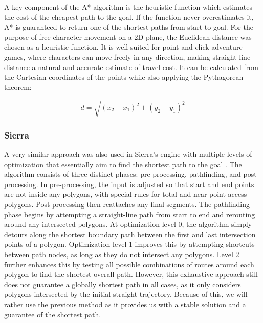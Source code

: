 A key component of the A* algorithm is the heuristic function which estimates the cost of the cheapest path to the goal. If the function never overestimates it, A* is guaranteed to return one of the shortest paths from start to goal. For the purpose of free character movement on a 2D plane, the Euclidean distance was chosen as a heuristic function. It is well suited for point-and-click adventure games, where characters can move freely in any direction, making straight-line distance a natural and accurate estimate of travel cost.  It can be calculated from the Cartesian coordinates of the points while also applying the Pythagorean theorem:

\[
d = \sqrt{(x_2 - x_1)^2 + (y_2 - y_1)^2}
\]

\subsubsection{Sierra}
A very similar approach was also used in Sierra's engine with multiple levels of optimization that essentially aim to find the shortest path to the goal \cite{ScummVM-patent}. The algorithm consists of three distinct phases: pre-processing, pathfinding, and post-processing. In pre-processing, the input is adjusted so that start and end points are not inside any polygons, with special rules for total and near-point access polygons. Post-processing then reattaches any final segments. The pathfinding phase begins by attempting a straight-line path from start to end and rerouting around any intersected polygons. At optimization level 0, the algorithm simply detours along the shortest boundary path between the first and last intersection points of a polygon. Optimization level 1 improves this by attempting shortcuts between path nodes, as long as they do not intersect any polygons. Level 2 further enhances this by testing all possible combinations of routes around each polygon to find the shortest overall path. However, this exhaustive approach still does not guarantee a globally shortest path in all cases, as it only considers polygons intersected by the initial straight trajectory. Because of this, we will rather use the previous method as it provides us with a stable solution and a guarantee of the shortest path.



